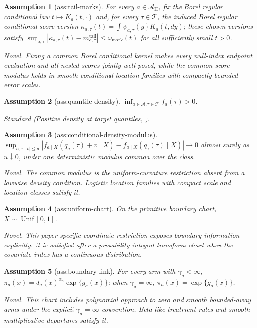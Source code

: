 \documentclass{article}
\newtheorem{assumption}{Assumption}
\begin{document}
\begin{assumption}[ass:tail-marks]\label{ass:tail-marks}
For every \(a\in\mathcal A_{\mathrm H}\), fix the Borel regular conditional law \(t\mapsto K_a(t,\cdot)\) and, for every \(\tau\in\mathcal T\), the induced Borel regular conditional-score version \(\kappa_{a,\tau}(t)=\int\psi_{a,\tau}(y)K_a(t,dy)\); these chosen versions satisfy \(\sup_{a,\tau}|\kappa_{a,\tau}(t)-m^{\mathrm{tail}}_{a,\tau}|\le\omega_{\mathrm{mark}}(t)\) for all sufficiently small \(t>0\).
\par\smallskip\noindent\emph{Novel.} Fixing a common Borel conditional kernel makes every null-index endpoint evaluation and all nested scores jointly well posed, while the common score modulus holds in smooth conditional-location families with compactly bounded error scales.
\end{assumption}

\begin{assumption}[ass:quantile-density]\label{ass:quantile-density}
\(\inf_{a\in\mathcal A,\tau\in\mathcal T}f_a(\tau)>0\).
\par\smallskip\noindent\emph{Standard} (Positive density at target quantiles, \cite{Firpo2007}).
\end{assumption}

\begin{assumption}[ass:conditional-density-modulus]\label{ass:conditional-density-modulus}
\(\sup_{a,\tau,|v|\le u}|f_{a\mid X}(q_a(\tau)+v\mid X)-f_{a\mid X}(q_a(\tau)\mid X)|\to0\) almost surely as \(u\downarrow0\), under one deterministic modulus common over the class.
\par\smallskip\noindent\emph{Novel.} The common modulus is the uniform-curvature restriction absent from a lawwise density condition. Logistic location families with compact scale and location classes satisfy it.
\end{assumption}

\begin{assumption}[ass:uniform-chart]\label{ass:uniform-chart}
On the primitive boundary chart, \(X\sim\operatorname{Unif}[0,1]\).
\par\smallskip\noindent\emph{Novel.} This paper-specific coordinate restriction exposes boundary information explicitly. It is satisfied after a probability-integral-transform chart when the covariate index has a continuous distribution.
\end{assumption}

\begin{assumption}[ass:boundary-link]\label{ass:boundary-link}
For every arm with \(\gamma_a<\infty\), \(\pi_a(x)=d_a(x)^{\alpha_a}\exp\{g_a(x)\}\); when \(\gamma_a=\infty\), \(\pi_a(x)=\exp\{g_a(x)\}\).
\par\smallskip\noindent\emph{Novel.} This chart includes polynomial approach to zero and smooth bounded-away arms under the explicit \(\gamma_a=\infty\) convention. Beta-like treatment rules and smooth multiplicative departures satisfy it.
\end{assumption}
\end{document}
